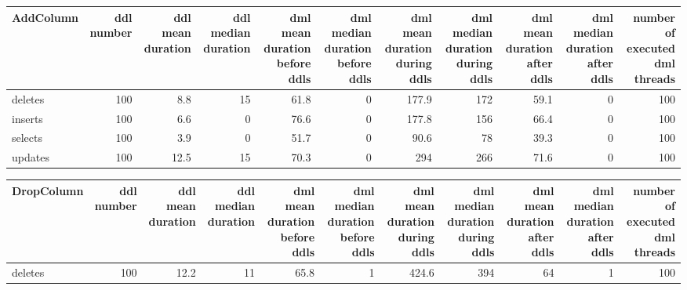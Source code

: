 \begin{tabular}{lrrrrrrrrrr}
\hline
 AddColumn   &   ddl number &   ddl mean duration &   ddl median duration &   dml mean duration before ddls &   dml median duration before ddls &   dml mean duration during ddls &   dml median duration during ddls &   dml mean duration after ddls &   dml median duration after ddls &   number of executed dml threads \\
\hline
 deletes     &          100 &                 8.8 &                    15 &                            61.8 &                                 0 &                           177.9 &                               172 &                           59.1 &                                0 &                              100 \\
 inserts     &          100 &                 6.6 &                     0 &                            76.6 &                                 0 &                           177.8 &                               156 &                           66.4 &                                0 &                              100 \\
 selects     &          100 &                 3.9 &                     0 &                            51.7 &                                 0 &                            90.6 &                                78 &                           39.3 &                                0 &                              100 \\
 updates     &          100 &                12.5 &                    15 &                            70.3 &                                 0 &                           294   &                               266 &                           71.6 &                                0 &                              100 \\
\hline
\end{tabular}\begin{tabular}{lrrrrrrrrrr}
\hline
 DropColumn   &   ddl number &   ddl mean duration &   ddl median duration &   dml mean duration before ddls &   dml median duration before ddls &   dml mean duration during ddls &   dml median duration during ddls &   dml mean duration after ddls &   dml median duration after ddls &   number of executed dml threads \\
\hline
 deletes      &          100 &                12.2 &                    11 &                            65.8 &                                 1 &                           424.6 &                             394   &                           64   &                                1 &                              100 \\

\end{tabular}

